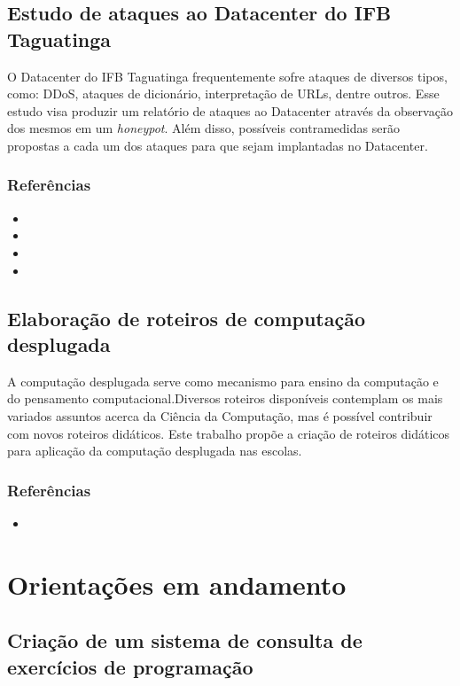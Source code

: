 \documentclass{article}
\newcommand*{\nsubsection}[1]{
    \subsection*{#1}
}
\begin{document}
\nsubsection{Estudo de ataques ao Datacenter do IFB Taguatinga}

O Datacenter do IFB Taguatinga frequentemente sofre ataques de diversos tipos, como: DDoS, ataques de dicionário, interpretação de URLs, dentre outros.
Esse estudo visa produzir um relatório de ataques ao Datacenter através da observação dos mesmos em um \textit{honeypot}. Além disso, possíveis contramedidas serão propostas a cada um dos ataques para que sejam implantadas no Datacenter.

\subsubsection*{Referências}

\begin{itemize}
	\item {}
	\item {}
	\item {}
	\item {}
\end{itemize}



\nsubsection{Elaboração de roteiros de computação desplugada}

A computação desplugada serve como mecanismo para ensino da computação e do pensamento computacional.Diversos roteiros disponíveis contemplam os mais variados assuntos acerca da Ciência da Computação, mas é possível contribuir com novos roteiros didáticos. Este trabalho propõe a criação de roteiros didáticos para aplicação da computação desplugada nas escolas.

\subsubsection*{Referências}

\begin{itemize}
	\item {}
\end{itemize}

\newpage

\section{Orientações em andamento}



\nsubsection{Criação de um sistema de consulta de exercícios de programação}
\end{document}
